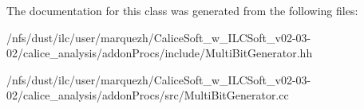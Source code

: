 The documentation for this class was generated from the following files\-:\begin{DoxyCompactItemize}
\item 
/nfs/dust/ilc/user/marquezh/\-Calice\-Soft\-\_\-w\-\_\-\-I\-L\-C\-Soft\-\_\-v02-\/03-\/02/calice\-\_\-analysis/addon\-Procs/include/Multi\-Bit\-Generator.\-hh\item 
/nfs/dust/ilc/user/marquezh/\-Calice\-Soft\-\_\-w\-\_\-\-I\-L\-C\-Soft\-\_\-v02-\/03-\/02/calice\-\_\-analysis/addon\-Procs/src/Multi\-Bit\-Generator.\-cc\end{DoxyCompactItemize}
